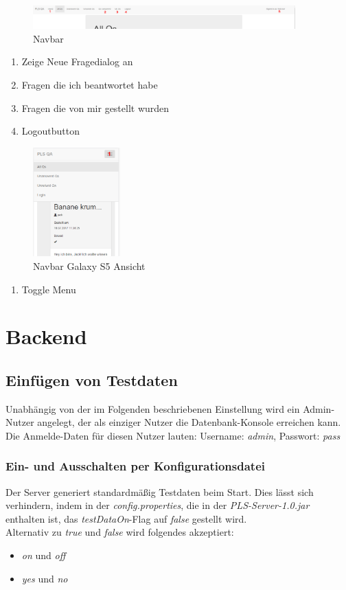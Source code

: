 \documentclass[a4paper]{report}
\begin{document}
\begin{figure}[h!]
	\centering
	\includegraphics[width=0.9\textwidth]{navbarLoggedIn.PNG}
	\caption{Navbar}
	\label{fig:navbar2}
\end{figure}
\centering\begin{enumerate}
	\item Zeige Neue Fragedialog an
	\item Fragen die ich beantwortet habe
	\item Fragen die von mir gestellt wurden
	\item Logoutbutton
\end{enumerate}

\begin{figure}[h!]
	\centering
	\includegraphics[width=0.3\textwidth]{AnsichtGalaxyS5.PNG}
	\caption{Navbar Galaxy S5 Ansicht}
	\label{fig:navbarResponive}
\end{figure}
\centering\begin{enumerate}
	\item Toggle Menu
\end{enumerate}

\part{Backend}
\chapter{Einfügen von Testdaten}
\label{admin}
Unabhängig von der im Folgenden beschriebenen Einstellung wird ein Admin-Nutzer angelegt, der als einziger Nutzer die Datenbank-Konsole erreichen kann. Die Anmelde-Daten für diesen Nutzer lauten: Username: \textit{admin}, Passwort: \textit{pass}
\section{Ein- und Ausschalten per Konfigurationsdatei}
Der Server generiert standardmäßig Testdaten beim Start. Dies lässt sich verhindern, indem in der \textit{config.properties}, die in der \textit{PLS-Server-1.0.jar} enthalten ist, das \textit{testDataOn}-Flag auf \textit{false} gestellt wird.\\
Alternativ zu \textit{true} und \textit{false} wird folgendes akzeptiert:
\begin{itemize}
	\item \textit{on} und \textit{off}
	\item \textit{yes} und \textit{no}
\end{itemize}
\end{document}
